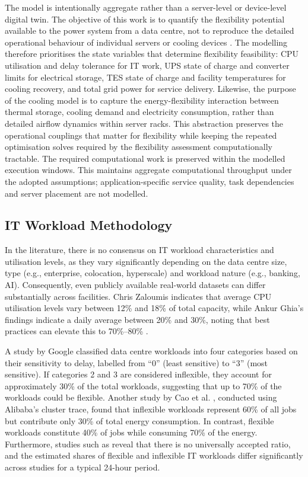 \documentclass[lettersize,journal]{IEEEtran}
\newcommand{\rev}[1]{#1}
\begin{document}
\rev{The model is intentionally aggregate rather than a server-level or device-level digital twin. The objective of this work is to quantify the flexibility potential available to the power system from a data centre, not to reproduce the detailed operational behaviour of individual servers or cooling devices \cite{barroso2018datacenter,dayarathna2015data}. The modelling therefore prioritises the state variables that determine flexibility feasibility: CPU utilisation and delay tolerance for IT work, UPS state of charge and converter limits for electrical storage, TES state of charge and facility temperatures for cooling recovery, and total grid power for service delivery. Likewise, the purpose of the cooling model is to capture the energy-flexibility interaction between thermal storage, cooling demand and electricity consumption, rather than detailed airflow dynamics within server racks. This abstraction preserves the operational couplings that matter for flexibility while keeping the repeated optimisation solves required by the flexibility assessment computationally tractable. The required computational work is preserved within the modelled execution windows. This maintains aggregate computational throughput under the adopted assumptions; application-specific service quality, task dependencies and server placement are not modelled.}

\label{sec: methodology}
\subsection{IT Workload Methodology}\label{sec:it-workload-methodology}
 
In the literature, there is no consensus on IT workload characteristics and utilisation levels, as they vary significantly depending on the data centre size, type (e.g., enterprise, colocation, hyperscale) and workload nature (e.g., banking, AI). Consequently, even publicly available real-world datasets can differ substantially across facilities. Chris Zaloumis \cite{Zaloumis2022IBM} indicates that average CPU utilisation levels vary between 12\% and 18\% of total capacity, while Ankur Ghia's findings indicate a daily average between 20\% and 30\%, noting that best practices can elevate this to 70\%--80\% \cite{Ghia2011McKinsey}. 
 
 A study by Google \cite{6779441} classified data centre workloads into four categories based on their sensitivity to delay, labelled from ``0'' (least sensitive) to ``3'' (most sensitive). If categories 2 and 3 are considered inflexible, they account for approximately 30\% of the total workloads, suggesting that up to 70\% of the workloads could be flexible. Another study by Cao et al. \cite{Cao2022ApEn}, conducted using Alibaba’s cluster trace, found that inflexible workloads represent 60\% of all jobs but contribute only 30\% of total energy consumption. In contrast, flexible workloads constitute 40\% of jobs while consuming 70\% of the energy. Furthermore, studies such as \cite{Misaghian2023TIA,Xu2023SPIE,Zhou2024IJEPES,Fu2020ApEn,Liu2012PER} reveal that there is no universally accepted ratio, and the estimated shares of flexible and inflexible IT workloads differ significantly across studies for a typical 24-hour period. 
\end{document}
